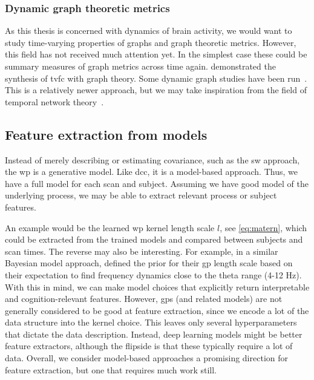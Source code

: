 \subsubsection{Dynamic graph theoretic metrics}

As this thesis is concerned with dynamics of brain activity, we would want to study time-varying properties of graphs and graph theoretic metrics.
However, this field has not received much attention yet.
%
In the simplest case these could be summary measures of graph metrics across time again.
\textcite{Zalesky2014} demonstrated the synthesis of \gls{tvfc} with graph theory.
Some dynamic graph studies have been run~\parencite{Bassett2011, Bassett2013}.
This is a relatively newer approach, but we may take inspiration from the field of temporal network theory~\parencite{Holme2012, Yu2015, Thompson2017}.

\subsection{Feature extraction from models}
\label{subsec:model-features}

Instead of merely describing or estimating covariance, such as the \gls{sw} approach, the \gls{wp} is a generative model.
Like \gls{dcc}, it is a model-based approach.
Thus, we have a full model for each scan and subject.
Assuming we have good model of the underlying process, we may be able to extract relevant process or subject features.

An example would be the learned \gls{wp} kernel length scale $l$, see \cref{eq:matern}, which could be extracted from the trained models and compared between subjects and scan times.
The reverse may also be interesting.
For example, in a similar Bayesian model approach, \textcite{Li2019a} defined the prior for their \gls{gp} length scale based on their expectation to find frequency dynamics close to the theta range (4-12 Hz).
%
With this in mind, we can make model choices that explicitly return interpretable and cognition-relevant features.
However, \glspl{gp} (and related models) are not generally considered to be good at feature extraction, since we encode a lot of the data structure into the kernel choice.
This leaves only several hyperparameters that dictate the data description.
Instead, deep learning models might be better feature extractors, although the flipside is that these typically require a lot of data.
Overall, we consider model-based approaches a promising direction for feature extraction, but one that requires much work still.
